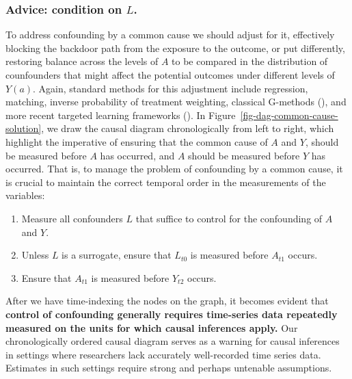 \documentclass[
  singlecolumn,
  9pt]{article}
\providecommand{\tightlist}{%
  \setlength{\itemsep}{0pt}\setlength{\parskip}{0pt}}\usepackage{longtable,booktabs,array}
\begin{document}
\subsubsection{\texorpdfstring{Advice: condition on
\(L\).}{Advice: condition on L.}}\label{advice-condition-on-l.}

To address confounding by a common cause we should adjust for it,
effectively blocking the backdoor path from the exposure to the outcome,
or put differently, restoring balance across the levels of \(A\) to be
compared in the distribution of counfounders that might affect the
potential outcomes under different levels of \(Y(a)\). Again, standard
methods for this adjustment include regression, matching, inverse
probability of treatment weighting, classical G-methods
(), and more recent
targeted learning frameworks (). In Figure~\ref{fig-dag-common-cause-solution}, we
draw the causal diagram chronologically from left to right, which
highlight the imperative of ensuring that the common cause of \(A\) and
\(Y\), should be measured before \(A\) has occurred, and \(A\) should be
measured before \(Y\) has occurred. That is, to manage the problem of
confounding by a common cause, it is crucial to maintain the correct
temporal order in the measurements of the variables:

\begin{enumerate}
\def\labelenumi{\arabic{enumi}.}
\tightlist
\item
  Measure all confounders \(L\) that suffice to control for the
  confounding of \(A\) and \(Y\).
\item
  Unless \(L\) is a surrogate, ensure that \(L_{t0}\) is measured before
  \(A_{t1}\) occurs.
\item
  Ensure that \(A_{t1}\) is measured before \(Y_{t2}\) occurs.
\end{enumerate}

After we have time-indexing the nodes on the graph, it becomes evident
that \textbf{control of confounding generally requires time-series data
repeatedly measured on the units for which causal inferences apply.} Our
chronologically ordered causal diagram serves as a warning for causal
inferences in settings where researchers lack accurately well-recorded
time series data. Estimates in such settings require strong and perhaps
untenable assumptions.
\end{document}
